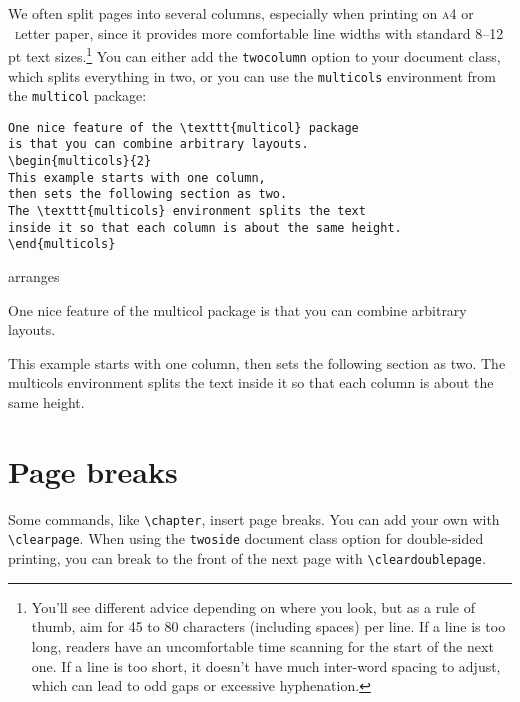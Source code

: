We often split pages into several columns, especially when printing on
\textsc{a4} or ~\textsc{l}etter paper,
since it provides more comfortable line widths with standard
8--12\,pt text sizes.\punckern\footnote{You'll see different advice depending
on where you look, but as a rule of thumb,
aim for 45 to 80 characters (including spaces) per line.
If a line is too long, readers have an uncomfortable time scanning for
the start of the next one.
If a line is too short, it doesn't have much inter-word spacing to adjust,
which can lead to odd gaps or excessive hyphenation.}
You can either add the \texttt{twocolumn} option to your document class,
which splits everything in two, or you can use the \texttt{multicols}
environment from the \texttt{multicol} package:
\begin{leftfigure}
\begin{lstlisting}
One nice feature of the \texttt{multicol} package
is that you can combine arbitrary layouts.
\begin{multicols}{2}
This example starts with one column,
then sets the following section as two.
The \texttt{multicols} environment splits the text
inside it so that each column is about the same height.
\end{multicols}
\end{lstlisting}
\end{leftfigure}
arranges
\begin{leftfigure}
\lm%
One nice feature of the {\lt multicol} package
is that you can combine arbitrary layouts.
\begin{multicols}{2}
This example starts with one column,
then sets the following section as two.
The \mbox{\lt multicols} environment splits the text
inside it so that each column is about the same height.
\end{multicols}
\end{leftfigure}

\section{Page breaks}

Some commands, like \verb|\chapter|, insert page breaks.
You can add your own with \verb|\clearpage|.
When using the \texttt{twoside} document class option for double-sided
printing, you can break to the front of the next page with
\verb|\cleardoublepage|.

